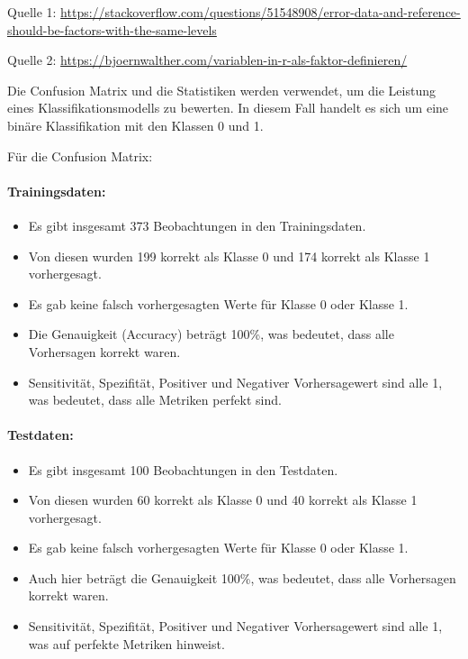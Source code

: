 \documentclass[
  letterpaper,
  DIV=11,
  numbers=noendperiod]{scrartcl}
\let\oldparagraph\paragraph
\renewcommand{\paragraph}[1]{\oldparagraph{#1}\mbox{}}
\begin{document}
Quelle 1:
\url{https://stackoverflow.com/questions/51548908/error-data-and-reference-should-be-factors-with-the-same-levels}

Quelle 2:
\url{https://bjoernwalther.com/variablen-in-r-als-faktor-definieren/}

Die Confusion Matrix und die Statistiken werden verwendet, um die
Leistung eines Klassifikationsmodells zu bewerten. In diesem Fall
handelt es sich um eine binäre Klassifikation mit den Klassen 0 und 1.

Für die Confusion Matrix:

\hypertarget{trainingsdaten}{%
\paragraph{Trainingsdaten:}\label{trainingsdaten}}

\begin{itemize}
\item
  Es gibt insgesamt 373 Beobachtungen in den Trainingsdaten.
\item
  Von diesen wurden 199 korrekt als Klasse 0 und 174 korrekt als Klasse
  1 vorhergesagt.
\item
  Es gab keine falsch vorhergesagten Werte für Klasse 0 oder Klasse 1.
\item
  Die Genauigkeit (Accuracy) beträgt 100\%, was bedeutet, dass alle
  Vorhersagen korrekt waren.
\item
  Sensitivität, Spezifität, Positiver und Negativer Vorhersagewert sind
  alle 1, was bedeutet, dass alle Metriken perfekt sind.
\end{itemize}

\hypertarget{testdaten}{%
\paragraph{Testdaten:}\label{testdaten}}

\begin{itemize}
\item
  Es gibt insgesamt 100 Beobachtungen in den Testdaten.
\item
  Von diesen wurden 60 korrekt als Klasse 0 und 40 korrekt als Klasse 1
  vorhergesagt.
\item
  Es gab keine falsch vorhergesagten Werte für Klasse 0 oder Klasse 1.
\item
  Auch hier beträgt die Genauigkeit 100\%, was bedeutet, dass alle
  Vorhersagen korrekt waren.
\item
  Sensitivität, Spezifität, Positiver und Negativer Vorhersagewert sind
  alle 1, was auf perfekte Metriken hinweist.
\end{itemize}
\end{document}
